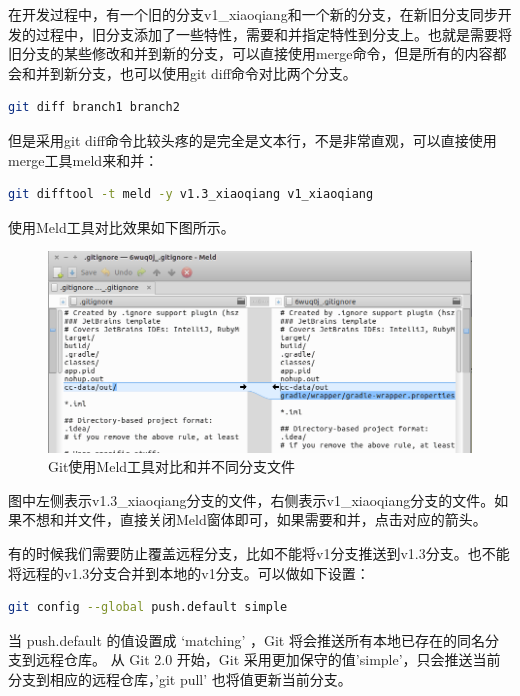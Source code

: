 \documentclass[12pt]{book}
\numberwithin{dummy}{section}
\theoremstyle{ocrenumbox}
\theoremstyle{blacknumex}
\theoremstyle{blacknumbox}
\theoremstyle{ocrenum}
\begin{document}
在开发过程中，有一个旧的分支v1\_xiaoqiang和一个新的分支，在新旧分支同步开发的过程中，旧分支添加了一些特性，需要和并指定特性到分支上。也就是需要将旧分支的某些修改和并到新的分支，可以直接使用merge命令，但是所有的内容都会和并到新分支，也可以使用git diff命令对比两个分支。

\begin{lstlisting}[language=Bash]
git diff branch1 branch2
\end{lstlisting}

但是采用git diff命令比较头疼的是完全是文本行，不是非常直观，可以直接使用merge工具meld来和并：

\begin{lstlisting}[language=Bash]
git difftool -t meld -y v1.3_xiaoqiang v1_xiaoqiang
\end{lstlisting}

使用Meld工具对比效果如下图所示。

\begin{figure}[htbp]
	\centering
	\includegraphics[scale=0.4]{gitdiffusingmeldtool.png}
	\caption{Git使用Meld工具对比和并不同分支文件}
	\label{fig:gitdiffusingmeldtool}
\end{figure}

图中左侧表示v1.3\_xiaoqiang分支的文件，右侧表示v1\_xiaoqiang分支的文件。如果不想和并文件，直接关闭Meld窗体即可，如果需要和并，点击对应的箭头。

有的时候我们需要防止覆盖远程分支，比如不能将v1分支推送到v1.3分支。也不能将远程的v1.3分支合并到本地的v1分支。可以做如下设置：

\begin{lstlisting}[language=Bash]
git config --global push.default simple
\end{lstlisting}

当 push.default 的值设置成 ‘matching’ ，Git 将会推送所有本地已存在的同名分支到远程仓库。
从 Git 2.0 开始，Git 采用更加保守的值'simple'，只会推送当前分支到相应的远程仓库，'git pull' 也将值更新当前分支。
\end{document}
